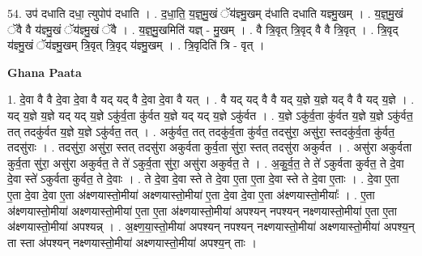 \documentclass[17pt]{extarticle}
\begin{document}
54. उप॑ दधाति दधा॒ त्युपोप॑ दधाति । . द॒धा॒ति॒ य॒ज्ञ्॒मु॒खं ॅय॑ज्ञ्मु॒खम् द॑धाति दधाति यज्ञ्मु॒खम् । . य॒ज्ञ्॒मु॒खं ॅवै वै य॑ज्ञ्मु॒खं ॅय॑ज्ञ्मु॒खं ॅवै । . य॒ज्ञ्॒मु॒खमिति॑ यज्ञ् - मु॒खम् । . वै त्रि॒वृत् त्रि॒वृद् वै वै त्रि॒वृत् । . त्रि॒वृद् य॑ज्ञ्मु॒खं ॅय॑ज्ञ्मु॒खम् त्रि॒वृत् त्रि॒वृद् य॑ज्ञ्मु॒खम् । . त्रि॒वृदिति॑ त्रि - वृत् । \newline

\textbf{Ghana Paata } \newline

1. दे॒वा वै वै दे॒वा दे॒वा वै यद् यद् वै दे॒वा दे॒वा वै यत् । . वै यद् यद् वै वै यद् य॒ज्ञे य॒ज्ञे यद् वै वै यद् य॒ज्ञे । . यद् य॒ज्ञे य॒ज्ञे यद् यद् य॒ज्ञे ऽकु॑र्व॒ता कु॑र्वत य॒ज्ञे यद् यद् य॒ज्ञे ऽकु॑र्वत । . य॒ज्ञे ऽकु॑र्व॒ता कु॑र्वत य॒ज्ञे य॒ज्ञे ऽकु॑र्वत॒ तत् तदकु॑र्वत य॒ज्ञे य॒ज्ञे ऽकु॑र्वत॒ तत् । . अकु॑र्वत॒ तत् तदकु॑र्व॒ता कु॑र्वत॒ तदसु॑रा॒ असु॑रा॒ स्तदकु॑र्व॒ता कु॑र्वत॒ तदसु॑राः । . तदसु॑रा॒ असु॑रा॒ स्तत् तदसु॑रा अकुर्वता कुर्व॒ता सु॑रा॒ स्तत् तदसु॑रा अकुर्वत । . असु॑रा अकुर्वता कुर्व॒ता सु॑रा॒ असु॑रा अकुर्वत॒ ते ते॑ ऽकुर्व॒ता सु॑रा॒ असु॑रा अकुर्वत॒ ते । . अ॒कु॒र्व॒त॒ ते ते॑ ऽकुर्वता कुर्वत॒ ते दे॒वा दे॒वा स्ते॑ ऽकुर्वता कुर्वत॒ ते दे॒वाः । . ते दे॒वा दे॒वा स्ते ते दे॒वा ए॒ता ए॒ता दे॒वा स्ते ते दे॒वा ए॒ताः । . दे॒वा ए॒ता ए॒ता दे॒वा दे॒वा ए॒ता अ॑क्ष्णयास्तो॒मीया॑ अक्ष्णयास्तो॒मीया॑ ए॒ता दे॒वा दे॒वा ए॒ता अ॑क्ष्णयास्तो॒मीयाः᳚ । . ए॒ता अ॑क्ष्णयास्तो॒मीया॑ अक्ष्णयास्तो॒मीया॑ ए॒ता ए॒ता अ॑क्ष्णयास्तो॒मीया॑ अपश्यन् नपश्यन् नक्ष्णयास्तो॒मीया॑ ए॒ता ए॒ता अ॑क्ष्णयास्तो॒मीया॑ अपश्यन्न् । . अ॒क्ष्ण॒या॒स्तो॒मीया॑ अपश्यन् नपश्यन् नक्ष्णयास्तो॒मीया॑ अक्ष्णयास्तो॒मीया॑ अपश्य॒न् ता स्ता अ॑पश्यन् नक्ष्णयास्तो॒मीया॑ अक्ष्णयास्तो॒मीया॑ अपश्य॒न् ताः । \newline
\end{document}

